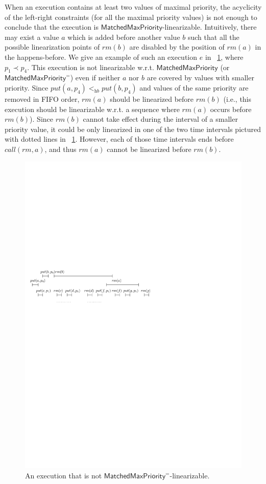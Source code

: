 When an execution contains at least two values of maximal priority, the acyclicity of the left-right constraints (for all the maximal priority values) is not enough to conclude that the execution is $\mathsf{MatchedMaxPriority}$-linearizable.
Intuitively, there may exist a value $a$ which is added before another value $b$ such that all the possible linearization points of $\textit{rm}(b)$ are disabled by the position of $\textit{rm}(a)$ in the happens-before. We give an example of such an execution $e$ in \figurename~\ref{fig:introduce pb order}, where $p_1\prec p_4$. This execution  is not linearizable w.r.t. $\mathsf{MatchedMaxPriority}$ (or $\mathsf{MatchedMaxPriority}^{=}$) even if
neither $a$ nor $b$ are covered by values with smaller priority.
Since $\textit{put}(a,p_4) <_{\textit{hb}} \textit{put}(b,p_4)$ and values of the same priority are removed in FIFO order, $\textit{rm}(a)$ should be linearized before $\textit{rm}(b)$ (i.e., this execution should be linearizable w.r.t. a sequence where $\textit{rm}(a)$ occurs before $\textit{rm}(b)$).
Since $\textit{rm}(b)$ cannot take effect during the interval of a smaller priority value, it could be only linearized in one of the two time intervals pictured with dotted lines in \figurename~\ref{fig:introduce pb order}. However, each of those time intervals ends before $\textit{call}(\textit{rm},a)$, and thus $\textit{rm}(a)$ cannot be linearized before $\textit{rm}(b)$.

\begin{figure}[t]
  \centering
  \includegraphics[width=0.5 \textwidth]{figures/PIC-HIS-INTRO-PB-ORDER-EPQ.pdf}
  \caption{An execution that is not $\mathsf{MatchedMaxPriority}^=$-linearizable.}
  \label{fig:introduce pb order}
\end{figure}

